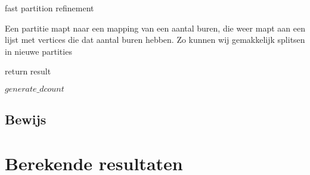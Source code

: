 \documentclass[twoside]{article}
\begin{document}
\begin{multicols}{2}
\begin{algorithm}[H]
{{{{}	



  }
 }
}

 \caption{fast partition refinement}
\end{algorithm}
\pagebreak

\begin{algorithm}[H]
Een partitie mapt naar een mapping van een aantal buren, die weer mapt aan een lijst met vertices die dat aantal buren hebben. Zo kunnen wij gemakkelijk splitsen in nieuwe partities \;


return result
 

\caption{$ generate\_dcount $}
\end{algorithm}




\subsection{Bewijs}

\section{Berekende resultaten}


\end{multicols}
\end{document}
